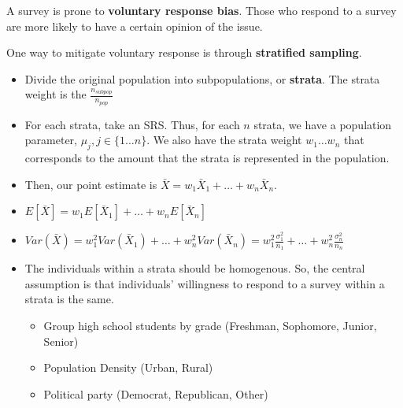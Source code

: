 \documentclass{article}
\begin{document}
A survey is prone to \textbf{voluntary response bias}. Those who respond to a survey are more likely to have a certain opinion of the issue.

One way to mitigate voluntary response is through \textbf{stratified sampling}.
\begin{itemize}
    \item Divide the original population into subpopulations, or \textbf{strata}. The strata weight is the $\frac{n_{subpop}}{n_{pop}}$
    \item For each strata, take an SRS. Thus, for each $n$ strata, we have a population parameter, $\mu_{j}, j \in \{1 \dots n\}$. We also have the strata weight $w_1 \dots w_n$ that corresponds to the amount that the strata is represented in the population.
    \item Then, our point estimate is $\bar{X} = w_1\bar{X}_1 + \dots + w_n\bar{X}_n$.
    \item $E[\bar{X}] = w_1E[\bar{X}_1] + \dots + w_nE[\bar{X}_n]$
    \item $Var(\bar{X}) = w_1^2Var(\bar{X}_1) + \dots + w_n^2Var(\bar{X}_n) = w_1^2\frac{\sigma_1^2}{n_1} + \dots + w_n^2\frac{\sigma_n^2}{n_n}$
    \item The individuals within a strata should be homogenous. So, the central assumption is that individuals' willingness to respond to a survey within a strata is the same.
        \begin{itemize}
            \item Group high school students by grade (Freshman, Sophomore, Junior, Senior)
            \item Population Density (Urban, Rural)
            \item Political party (Democrat, Republican, Other)
        \end{itemize}
\end{itemize}
\end{document}
